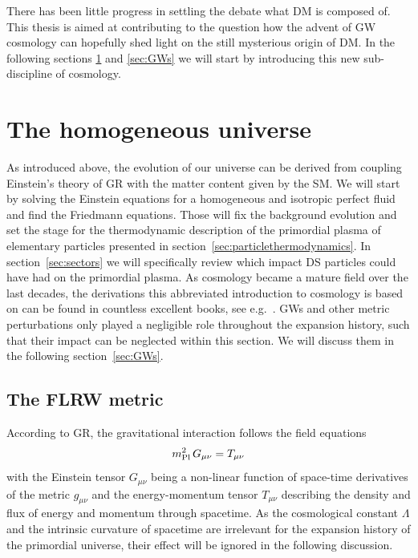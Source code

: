 There has been little progress in settling the debate what \ac{DM} is composed of. This thesis is aimed at contributing to the question how the advent of \ac{GW} cosmology can hopefully shed light on the still mysterious origin of \ac{DM}. In the following sections \ref{sec:homogeneouscosmo} and \ref{sec:GWs} we will start by introducing this new sub-discipline of cosmology. 

\section{The homogeneous universe} \label{sec:homogeneouscosmo}
As introduced above, the evolution of our universe can be derived from coupling Einstein's theory of \ac{GR} with the matter content given by the \ac{SM}.  We will start by solving the Einstein equations for a homogeneous and isotropic perfect fluid and find the Friedmann equations. Those will fix the background evolution and set the stage for the thermodynamic description of the primordial plasma of  elementary particles presented in section~\ref{sec:particlethermodynamics}. In section~\ref{sec:sectors} we will specifically review which impact \ac{DS} particles could have had on the primordial plasma. As cosmology became a mature field over the last decades, the  derivations this abbreviated introduction to cosmology is based on can be found in countless excellent books, see e.g.~\cite{Carroll:2004st, Maggiore:2018sht, Baumann:2022mni}. \acp{GW} and other metric perturbations only played a negligible role throughout the expansion history, such that their impact can be neglected within this section. We will discuss them in the following section~\ref{sec:GWs}.

\subsection{The FLRW metric}

According to \ac{GR}, the gravitational interaction follows the field equations
\begin{align}
	m_\text{Pl}^2 \, G_{\mu \nu} = T_{\mu \nu} 
	\label{eq:Einstein}
\end{align}
with the Einstein tensor $G_{\mu \nu}$ being a  non-linear function of space-time derivatives of the metric $g_{\mu \nu}$ and the energy-momentum tensor $T_{\mu \nu}$ describing the density and flux of energy and momentum through spacetime. As the cosmological constant $\Lambda$ and the intrinsic curvature of spacetime are irrelevant for the expansion history of the primordial universe, their effect will be ignored in the following discussion.

